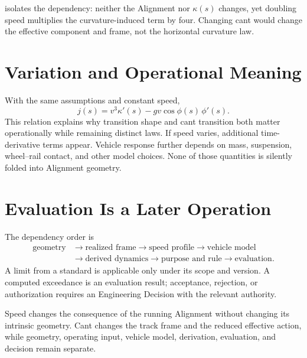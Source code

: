  isolates the dependency: neither the
Alignment nor \(\kappa(s)\) changes, yet doubling speed multiplies the
curvature-induced term by four. Changing cant would change the effective
component and frame, not the horizontal curvature law.

\section{Variation and Operational Meaning}

With the same assumptions and constant speed,
\[
j(s)=v^3\kappa'(s)-gv\cos\phi(s)\,\phi'(s).
\]
This relation explains why transition shape and cant transition both matter
operationally while remaining distinct laws. If speed varies, additional
time-derivative terms appear. Vehicle response further depends on mass,
suspension, wheel--rail contact, and other model choices. None of those
quantities is silently folded into Alignment geometry.

\section{Evaluation Is a Later Operation}

The dependency order is
\begin{align*}
\text{geometry}&\rightarrow\text{realized frame}
\rightarrow\text{speed profile}\rightarrow\text{vehicle model}\\
&\rightarrow\text{derived dynamics}
\rightarrow\text{purpose and rule}\rightarrow\text{evaluation}.
\end{align*}
A limit from a standard is applicable only under its scope and version. A
computed exceedance is an evaluation result; acceptance, rejection, or
authorization requires an Engineering Decision with the relevant authority.

\begin{summary}
Speed changes the consequence of the running Alignment without changing its
intrinsic geometry. Cant changes the track frame and the reduced effective
action, while geometry, operating input, vehicle model, derivation, evaluation,
and decision remain separate.
\end{summary}
